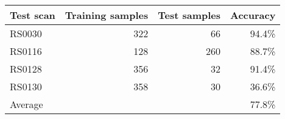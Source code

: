 \begin{tabular}{@{}lrrr@{}}
\toprule
Test scan & Training samples & Test samples & Accuracy \\ \midrule
RS0030    & 322              & 66           & 94.4\%   \\
RS0116    & 128              & 260          & 88.7\%   \\
RS0128    & 356              & 32           & 91.4\%   \\
RS0130    & 358              & 30           & 36.6\%   \\ \midrule
Average   &                  &              & 77.8\%   \\ \bottomrule
\end{tabular}